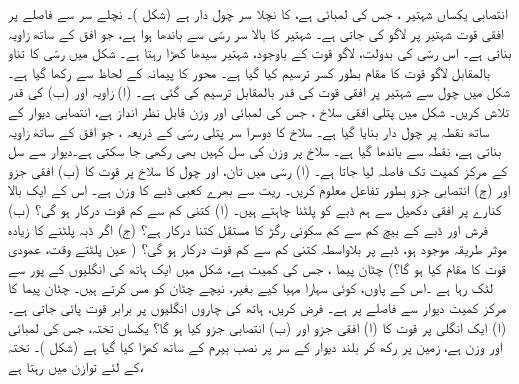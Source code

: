 انتصابی یکساں شہتیر ، جس کی لمبائی  ہے، کا  نچلا سر چول دار ہے (شکل )۔ نچلے سر سے   فاصلے پر  افقی قوت  شہتیر پر لاگو کی جاتی ہے۔ شہتیر کا  بالا سر رسّی سے باندھا ہوا ہے، جو افق کے ساتھ زاویہ  بناتی ہے۔ اس رسّی کی بدولت، لاگو قوت کے باوجود،  شہتیر سیدھا کھڑا رہتا ہے۔ شکل  میں رسّی کا تناو    بالمقابل لاگو قوت کا   مقام    بطور کسر  ترسیم کیا گیا ہے۔ محور  کا پیمانہ  کے لحاظ سے رکھا گیا ہے۔ شکل  میں چول سے شہتیر پر افقی  قوت  کی قدر   بالمقابل     ترسیم کی گئی ہے۔ (ا) زاویہ  اور (ب)  کی قدر تلاش کریں۔
شکل  میں پتلی  افقی  سلاخ ، جس کی لمبائی  اور  وزن قابل نظر انداز ہے، انتصابی دیوار کے ساتھ نقطہ  پر  چول  دار بنایا گیا ہے۔ سلاخ کا دوسرا سر  پتلی رسّی  کے ذریعہ  ، جو افق کے ساتھ زاویہ  بناتی ہے، نقطہ  سے باندھا گیا ہے۔ سلاخ پر  وزن کی سل کہیں بھی رکھی جا سکتی ہے۔دیوار سے سل کے مرکز کمیت تک فاصلہ   لیا جاتا ہے۔ (ا) رسّی میں تان، اور  چول کا سلاخ پر قوت  کا (ب) افقی جزو اور (ج) انتصابی جزو بطور تفاعل  معلوم کریں۔
ریت سے بھرے کعبی ڈبے  کا وزن  ہے۔ اس کے ایک بالا کنارے پر افقی دکھیل سے ہم ڈبے  کو پلٹنا چاہتے ہیں۔ (ا) کتنی کم سے کم قوت درکار ہو گی؟ (ب)  فرش اور ڈبے کے بیچ کم سے کم سکونی رگڑ کا مستقل کتنا درکار ہے؟ (ج)  اگر ڈبہ  پلٹنے کا  زیادہ   موثر طریقہ موجود ہو، ڈبے پر بلاواسطہ  کتنی کم سے کم قوت درکار ہو گی؟ ( عین پلٹتے وقت، عمودی قوت کا مقام کیا ہو گا؟)
چٹان پیما ، جس کی کمیت  ہے،   شکل  میں ایک ہاتھ کی  انگلیوں کے پور   سے لٹک رہا ہے ۔اس کے پاوں، کوئی سہارا مہیا کیے بغیر،   نیچے چٹان کو مس کرتے ہیں۔ چٹان پیما  کا مرکز کمیت دیوار سے  فاصلے پر ہے۔ فرض کریں،  ہاتھ کی چاروں انگلیوں پر برابر قوت پائی جاتی ہے۔ (ا)   ایک انگلی  پر قوت کا  (ا) افقی جزو  اور (ب) انتصابی جزو  کیا ہو گا؟
یکساں تختہ، جس کی لمبائی  اور وزن  ہے، زمین پر رکھ کر  بلند  دیوار کے سر پر نصب   بیرم کے  ساتھ کھڑا کیا گیا ہے (شکل )۔ تختہ  کے لئے توازن میں رہتا ہے، 
